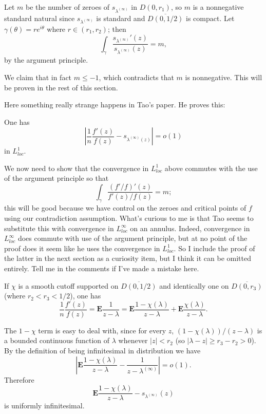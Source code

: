 \documentclass[12pt]{article}
\begin{document}
Let $m$ be the number of zeroes of $s_{\lambda^{(\infty)}}$ in $D(0, r_1)$, so $m$ is a nonnegative standard natural since $s_{\lambda^{(\infty)}}$ is standard and $\overline{D(0, 1/2)}$ is compact.
Let $\gamma(\theta) = re^{i\theta}$ where $r \in (r_1, r_2)$; then
$$\int_\gamma \frac{s_{\lambda^{(\infty)}}'(z)}{s_{\lambda^{(\infty)}}(z)} = m,$$
by the argument principle.

We claim that in fact $m \leq -1$, which contradicts that $m$ is nonnegative.
This will be proven in the rest of this section.

Here something really strange happens in Tao's paper. He proves this:
\begin{lemma}
One has
$$\left|\frac{1}{n} \frac{f'(z)}{f(z)} - s_{\lambda^{(\infty)}(z)}\right| = o(1)$$
in $L^1_{loc}$.
\end{lemma}
We now need to show that the convergence in $L^1_{loc}$ above commutes with the use of the argument principle so that
$$\int_\gamma \frac{(f'/f)'(z)}{f'(z)/f(z)} = m;$$
this will be good because we have control on the zeroes and critical points of $f$ using our contradiction assumption.
What's curious to me is that Tao seems to substitute this with convergence in $L^\infty_{loc}$ on an annulus.
Indeed, convergence in $L^\infty_{loc}$ does commute with use of the argument principle, but at no point of the proof does it seem like he uses the convergence in $L^1_{loc}$. So I include the proof of the latter in the next section as a curiosity item, but I think it can be omitted entirely.
Tell me in the comments if I've made a mistake here.

If $\chi$ is a smooth cutoff supported on $\overline{D(0, 1/2)}$ and identically one on $\overline{D(0, r_3)}$ (where $r_2 < r_3 < 1/2$), one has
$$\frac{1}{n} \frac{f'(z)}{f(z)} = \mathbf E \frac{1}{z - \lambda} = \mathbf E \frac{1 - \chi(\lambda)}{z - \lambda} + \mathbf E \frac{\chi(\lambda)}{z - \lambda}.$$

The $1 - \chi$ term is easy to deal with, since for every $z$, $(1 - \chi(\lambda))/(z - \lambda)$ is a bounded continuous function of $\lambda$ whenever $|z| < r_2$ (so $|\lambda - z| \geq r_3 - r_2 > 0$).
By the definition of being infinitesimal in distribution we have
$$\left|\mathbf E\frac{1 - \chi(\lambda)}{z - \lambda} - \frac{1}{z - \lambda^{(\infty)}}\right| = o(1).$$
Therefore
$$\mathbf E \frac{1 - \chi(\lambda)}{z - \lambda} - s_{\lambda^{(\infty)}}(z)$$
is uniformly infinitesimal.
\end{document}
